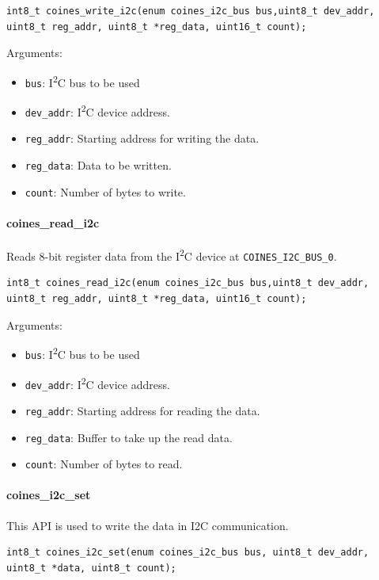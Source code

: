 \begin{lstlisting}
int8_t coines_write_i2c(enum coines_i2c_bus bus,uint8_t dev_addr, uint8_t reg_addr, uint8_t *reg_data, uint16_t count);
\end{lstlisting}

Arguments:
\begin{itemize}
	\item \texttt{bus}: I\textsuperscript{2}C bus to be used
	\item \texttt{dev\_addr}: I\textsuperscript{2}C device address.
	\item \texttt{reg\_addr}: Starting address for writing the data.
	\item \texttt{reg\_data}: Data to be written.
	\item \texttt{count}: Number of bytes to write.
\end{itemize}

\paragraph{coines\_read\_i2c}\label{CoinesReadI2c}
Reads 8-bit register data from the I\textsuperscript{2}C device at \texttt{COINES\_I2C\_BUS\_0}.

\begin{lstlisting}
int8_t coines_read_i2c(enum coines_i2c_bus bus,uint8_t dev_addr, uint8_t reg_addr, uint8_t *reg_data, uint16_t count);
\end{lstlisting}

Arguments:
\begin{itemize}
	\item \texttt{bus}: I\textsuperscript{2}C bus to be used
	\item \texttt{dev\_addr}: I\textsuperscript{2}C device address.
	\item \texttt{reg\_addr}: Starting address for reading the data.
	\item \texttt{reg\_data}: Buffer to take up the read data.
	\item \texttt{count}: Number of bytes to read.
\end{itemize}

\paragraph{coines\_i2c\_set}
This API is used to write the data in I2C communication.

\begin{lstlisting}
int8_t coines_i2c_set(enum coines_i2c_bus bus, uint8_t dev_addr, uint8_t *data, uint8_t count);
\end{lstlisting}

